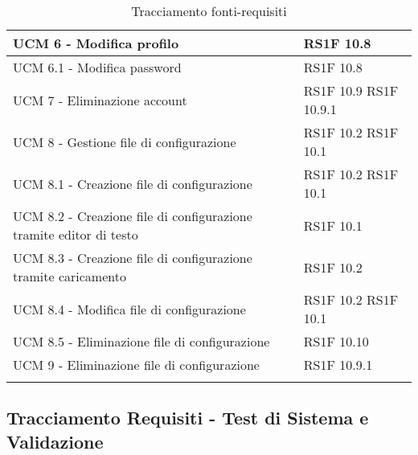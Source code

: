 \begin{center}
\begin{longtable}{ | p{5cm} | p{5cm} |}
            UCM 6 - Modifica profilo &  RS1F 10.8 \newline  \\ \hline      
            UCM 6.1 - Modifica password &  RS1F 10.8 \newline  \\ \hline      
            UCM 7 - Eliminazione account &  RS1F 10.9 \newline  RS1F 10.9.1 \newline  \\ \hline      
            UCM 8 - Gestione file di configurazione &  RS1F 10.2 \newline  RS1F 10.1 \newline  \\ \hline      
            UCM 8.1 - Creazione file di configurazione &  RS1F 10.2 \newline  RS1F 10.1 \newline  \\ \hline      
            UCM 8.2 - Creazione file di configurazione tramite editor di testo &  RS1F 10.1 \newline  \\ \hline      
            UCM 8.3 - Creazione file di configurazione tramite caricamento &  RS1F 10.2 \newline  \\ \hline      
            UCM 8.4 - Modifica file di configurazione &  RS1F 10.2 \newline  RS1F 10.1 \newline  \\ \hline      
            UCM 8.5 - Eliminazione file di configurazione &  RS1F 10.10 \newline  \\ \hline      
            UCM 9 - Eliminazione file di configurazione &  RS1F 10.9.1 \newline  \\ \hline  
      \caption{Tracciamento fonti-requisiti}   
      \end{longtable}
      \egroup
      \end{center}  
\clearpage
\subsection{Tracciamento Requisiti - Test di Sistema e Validazione}

